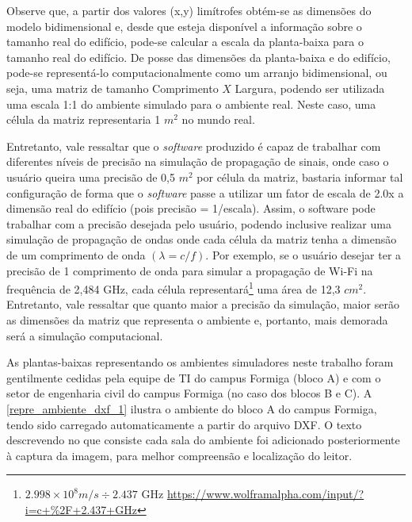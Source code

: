 \documentclass[
	12pt,				%
	twoside,			%
	a4paper,			%
	english,			%
	french,				%
	spanish,			%
	brazil				%
	]{abntex2}
\begin{document}
Observe que, a partir dos valores (x,y) limítrofes obtém-se as dimensões
do modelo bidimensional e, desde que esteja disponível a informação
sobre o tamanho real do edifício, pode-se calcular a escala da
planta-baixa para o tamanho real do edifício. De posse das dimensões da
planta-baixa e do edifício, pode-se representá-lo computacionalmente
como um arranjo bidimensional, ou seja, uma matriz de tamanho
Comprimento \(X\) Largura, podendo ser utilizada uma escala 1:1 do
ambiente simulado para o ambiente real. Neste caso, uma célula da matriz
representaria 1 \(m^{2}\) no mundo real.

Entretanto, vale ressaltar que o \emph{software} produzido é capaz de
trabalhar com diferentes níveis de precisão na simulação de propagação
de sinais, onde caso o usuário queira uma precisão de 0,5 \(m^{2}\) por
célula da matriz, bastaria informar tal configuração de forma que o
\emph{software} passe a utilizar um fator de escala de 2.0x a dimensão
real do edifício (pois precisão = 1/escala). Assim, o software pode
trabalhar com a precisão desejada pelo usuário, podendo inclusive
realizar uma simulação de propagação de ondas onde cada célula da matriz
tenha a dimensão de um comprimento de onda \((\lambda = c/f)\). Por
exemplo, se o usuário desejar ter a precisão de 1 comprimento de onda
para simular a propagação de Wi-Fi na frequência de 2,484 GHz, cada
célula representará\footnote{\(2.998\times10^{8} m/s \div 2.437\) GHz
  \url{https://www.wolframalpha.com/input/?i=c+\%2F+2.437+GHz}} uma área
de 12,3 \(cm^{2}\). Entretanto, vale ressaltar que quanto maior a
precisão da simulação, maior serão as dimensões da matriz que representa
o ambiente e, portanto, mais demorada será a simulação computacional.

As plantas-baixas representando os ambientes simuladores neste trabalho
foram gentilmente cedidas pela equipe de TI do campus Formiga (bloco A)
e com o setor de engenharia civil do campus Formiga (no caso dos blocos
B e C). A \autoref{repre_ambiente_dxf_1} ilustra o ambiente do bloco A
do campus Formiga, tendo sido carregado automaticamente a partir do
arquivo DXF. O texto descrevendo no que consiste cada sala do ambiente
foi adicionado posteriormente à captura da imagem, para melhor
compreensão e localização do leitor.
\end{document}
